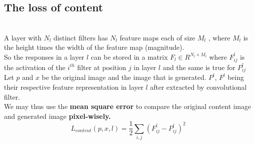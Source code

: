 \documentclass[11pt, a4paper]{article} %
\begin{document}
\subsection{The loss of content}
\\ A layer with $N_{l}$ distinct filters has $N_{l}$ feature maps each of size $M_{l}$
, where $M_{l}$ is the height times the width of the feature map (magnitude).
\\ So the responses in a layer $l$ can be stored in a matrix $F_{l} \in R^{N_l \times M_l}$ where $F^{l}_{ij}$ is the activation of the $i^{th}$ filter at position $j$ in layer $l$ and the same is true for $P^l_{ij}$ 
\\ Let $p$ and $x$ be the original image and the image that is generated. $P^{l}$, $F^{l}$ being their respective feature representation in layer $l$ after extracted by convolutional filter.
\\ We may thus use the \textbf{mean square error} to compare the original content image and generated image \textbf{pixel-wisely.}
\\ {\Large $$L_{content}(p, x, l) = \frac{1}{2} \sum_{i, j}(F^{l}_{ij} - P^l_{ij})^2$$}
\end{document}
